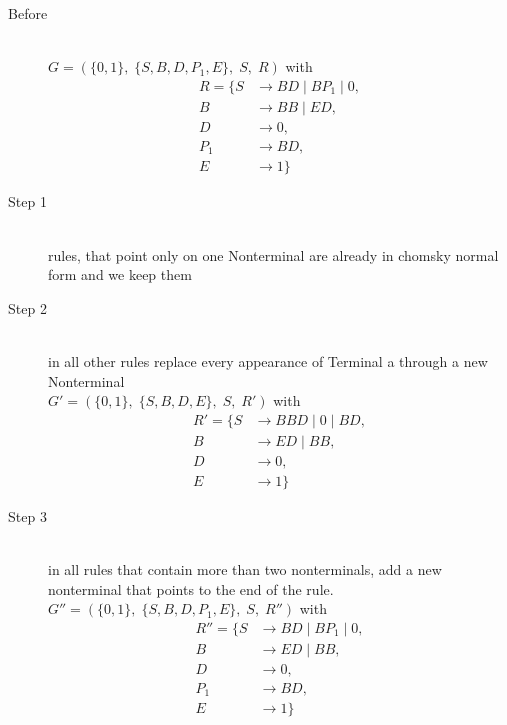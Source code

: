 \documentclass{article}
\begin{document}
\begin{description}
	\item[Before] \hfill \\ 
		$G=\left(\{	0, 1\},\;\{ S, B, D, P_1, E\},\;S,\;R\right)$ with
	\begin{align*}
		R=\{	S &\rightarrow BD\;|\;BP_1\;|\;0, \\ 
		B &\rightarrow BB\;|\;ED, \\ 
		D &\rightarrow 0, \\ 
		P_1 &\rightarrow BD, \\ 
		E &\rightarrow 1\}
	\end{align*}
	\item[Step 1] \hfill \\ 
	rules, that point only on one Nonterminal are already in chomsky normal form and we keep them\\ 
	\item[Step 2] \hfill \\ 
	in all other rules replace every appearance of Terminal a through a new Nonterminal\\ 
	$G'=\left(\{	0, 1\},\;\{ S, B, D, E\},\;S,\;R'\right)$ with
	\begin{align*}
		R'=\{	S &\rightarrow BBD\;|\;0\;|\;BD, \\ 
		B &\rightarrow ED\;|\;BB, \\ 
		D &\rightarrow 0, \\ 
		E &\rightarrow 1\}
	\end{align*}
	\item[Step 3] \hfill \\ 
	in all rules that contain more than two nonterminals, add a new nonterminal that points to the end of the rule.\\ 
	$G''=\left(\{	0, 1\},\;\{ S, B, D, P_1, E\},\;S,\;R''\right)$ with
	\begin{align*}
		R''=\{	S &\rightarrow BD\;|\;BP_1\;|\;0, \\ 
		B &\rightarrow ED\;|\;BB, \\ 
		D &\rightarrow 0, \\ 
		P_1 &\rightarrow BD, \\ 
		E &\rightarrow 1\}
	\end{align*}
\end{description}
\end{document}
